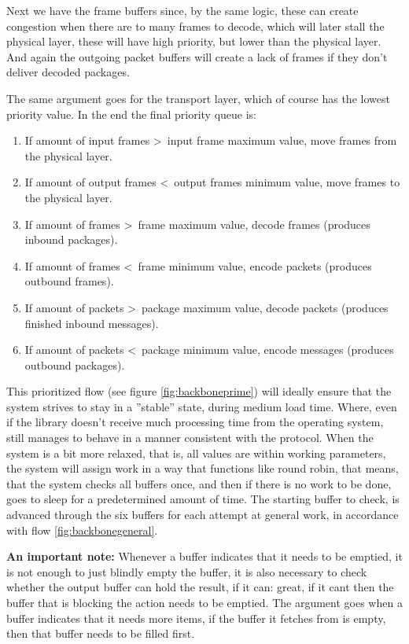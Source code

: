 Next we have the frame buffers since, by the same logic, these can create congestion when there are to many frames to decode, which will later stall the physical layer, these will have high priority, but lower than the physical layer.
And again the outgoing packet buffers will create a lack of frames if they don't deliver decoded packages.

The same argument goes for the transport layer, which of course has the lowest priority value.
 In the end the final priority queue is:

\begin{enumerate}
\item If amount of input frames \textgreater\, input frame maximum value, move frames from the physical layer.
\item If amount of output frames \textless\, output frames minimum value, move frames to the physical layer.
\item If amount of frames \textgreater\, frame maximum value, decode frames (produces inbound packages).
\item If amount of frames \textless\, frame minimum value, encode packets (produces outbound frames).
\item If amount of packets \textgreater\, package maximum value, decode packets (produces finished inbound messages).
\item If amount of packets \textless\, package minimum value, encode messages (produces outbound packages).
\end{enumerate}
This prioritized flow (see figure \ref{fig:backboneprime}) will ideally ensure that the system strives to stay in a ''stable'' state, during medium load time. Where, even if the library doesn't receive much processing time from the operating system, still manages to behave in a manner consistent with the protocol.
When the system is a bit more relaxed, that is, all values are within working parameters, the system will assign work in a way that functions like round robin, that means, that the system checks all buffers once, and then if there is no work to be done, goes to sleep for a predetermined amount of time. The starting buffer to check, is advanced through the six buffers for each attempt at general work, in accordance with flow \ref{fig:backbonegeneral}.




\textbf{An important note:}
Whenever a buffer indicates that it needs to be emptied, it is not enough to just blindly empty the buffer, it is also necessary to check whether the output buffer can hold the result, if it can: great, if it cant then the buffer that is blocking the action needs to be emptied.
The argument goes when a buffer indicates that it needs more items, if the buffer it fetches from is empty, then that buffer needs to be filled first.


